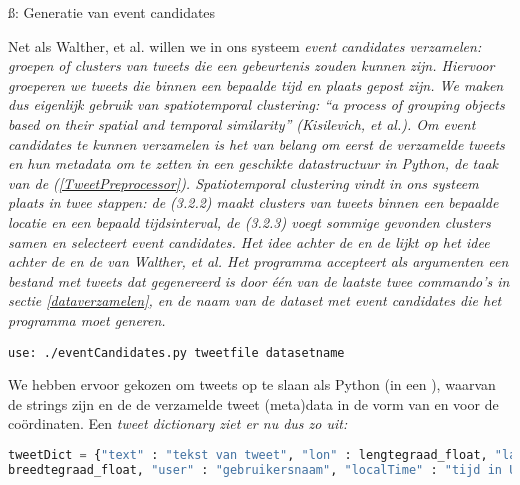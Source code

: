 {{\ss{: Generatie van event candidates}\label{EventCandidates}

Net als Walther, et al. willen we in ons systeem \it{event candidates} verzamelen: 
groepen of clusters van tweets die een gebeurtenis zouden kunnen zijn. Hiervoor 
groeperen we tweets die binnen een bepaalde tijd en plaats gepost zijn. We maken 
dus eigenlijk gebruik van \it{spatiotemporal clustering}: \it{“a process of grouping 
objects based on their spatial and temporal similarity”} (Kisilevich, et al.). 
\vl
Om event candidates te kunnen verzamelen is het van belang om eerst de 
verzamelde tweets en hun metadata om te zetten in een geschikte datastructuur in 
Python, de taak van de  (\ref{TweetPreprocessor}). Spatiotemporal clustering 
vindt in ons systeem plaats in twee stappen: de  (3.2.2) maakt 
clusters van tweets binnen een bepaalde locatie en een bepaald tijdsinterval, de 
 (3.2.3) voegt sommige gevonden clusters samen en selecteert event 
candidates.  Het idee achter de  en de  lijkt op het 
idee achter de  en de  van Walther, et al.
\vl
Het programma  accepteert als argumenten een bestand met tweets 
dat gegenereerd is door \'e\'en van de laatste twee commando's in sectie \ref{dataverzamelen}, en 
de naam van de dataset met event candidates die het programma moet generen.

\begin{lstlisting}
use: ./eventCandidates.py tweetfile datasetname
\end{lstlisting}
\vspace*{-10pt}

\label{TweetPreprocessor}

We hebben ervoor gekozen om tweets op te slaan als Python  (in een 
), waarvan de  strings zijn en de  de verzamelde tweet (meta)data 
in de vorm van  en  voor de co\"ordinaten. Een \it{tweet dictionary} ziet er nu dus zo uit:

\begin{lstlisting}[language=Python]
tweetDict = {"text" : "tekst van tweet", "lon" : lengtegraad_float, "lat" : 
breedtegraad_float, "user" : "gebruikersnaam", "localTime" : "tijd in UTC"}
\end{lstlisting}

}}
